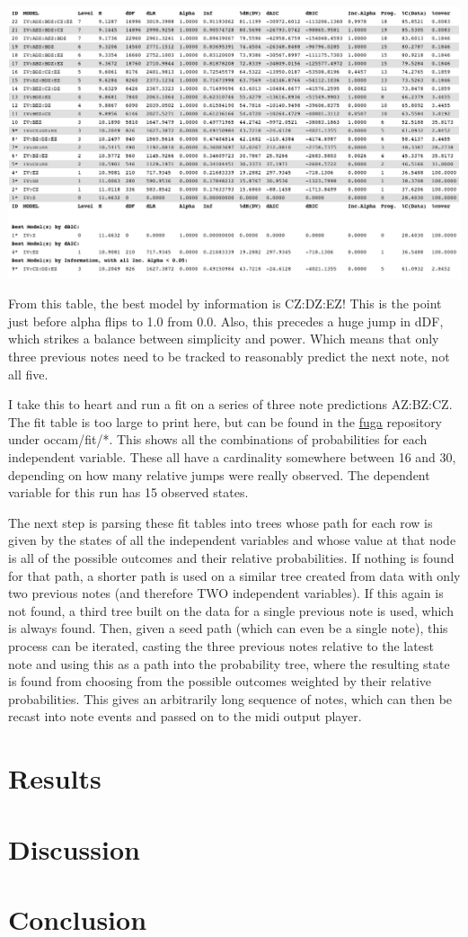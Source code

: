 \documentclass[11pt]{article}
\begin{document}
\begin{center}
\includegraphics[scale=0.45]{five.png}
\end{center}

From this table, the best model by information is CZ:DZ:EZ!  This is the point just before alpha flips to 1.0 from 0.0.  Also, this precedes a huge jump in dDF, which strikes a balance between simplicity and power.  Which means that only three previous notes need to be tracked to reasonably predict the next note, not all five.  

I take this to heart and run a fit on a series of three note predictions AZ:BZ:CZ.  The fit table is too large to print here, but can be found in the \href{http://github.com/prismofeverything/fuga}{fuga} repository under occam/fit/*.  This shows all the combinations of probabilities for each independent variable.  These all have a cardinality somewhere between 16 and 30, depending on how many relative jumps were really observed.  The dependent variable for this run has 15 observed states.  

The next step is parsing these fit tables into trees whose path for each row is given by the states of all the independent variables and whose value at that node is all of the possible outcomes and their relative probabilities.  If nothing is found for that path, a shorter path is used on a similar tree created from data with only two previous notes (and therefore TWO independent variables).  If this again is not found, a third tree built on the data for a single previous note is used, which is always found.  Then, given a seed path (which can even be a single note), this process can be iterated, casting the three previous notes relative to the latest note and using this as a path into the probability tree, where the resulting state is found from choosing from the possible outcomes weighted by their relative probabilities.  This gives an arbitrarily long sequence of notes, which can then be recast into note events and passed on to the midi output player.  

\section{Results}

\section{Discussion}

\section{Conclusion}
\end{document}
